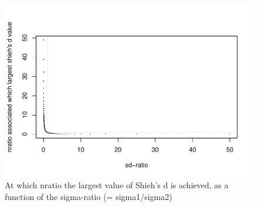 \documentclass[man]{apa6}
\begin{document}
\begin{figure}
\centering
\includegraphics{Appendix1_files/figure-latex/SHIEH6-1.pdf}
\caption{\label{fig:SHIEH6}At which nratio the largest value of Shieh's d is achieved, as a function of the sigma-ratio (= sigma1/sigma2)}
\end{figure}
\end{document}

